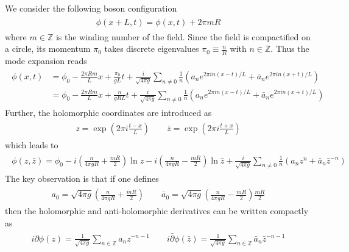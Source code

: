 We consider the following boson configuration
\begin{eqnarray}\begin{aligned}
\phi(x+L,t)=\phi(x,t)+2\pi mR
\end{aligned}\end{eqnarray}
where $m\in\mathbb{Z}$ is the winding number of the field. Since the field is compactified on a circle, its momentum $\pi_0$ takes discrete eigenvalues $\pi_0\equiv\frac{n}{R}$ with $n\in\mathbb{Z}$. Thus the mode expansion reads
\begin{eqnarray}\begin{aligned}
\label{eq:mode_expand_compact}
\phi(x,t)&=\phi_0-\frac{2\pi Rm}{L}x+\frac{\pi_0}{gL}t+\frac{i}{\sqrt{4\pi g}}\sum_{n\neq0}\frac{1}{n}(a_ne^{2\pi i n(x-t)/L}+\bar{a}_{n}e^{2\pi i n(x+t)/L})\\ 
&={\phi}_0-\frac{2\pi Rm}{L}x+\frac{n}{gRL}t+\frac{i}{\sqrt{4\pi g}}\sum_{n\neq0}\frac{1}{n}(a_ne^{2\pi i n(x-t)/L}+\bar{a}_{n}e^{2\pi i n(x+t)/L})
\end{aligned}\end{eqnarray}
Further, the holomorphic coordinates are introduced as
\begin{eqnarray}\begin{aligned}
z=\exp\left(2\pi i\frac{t-x}{L}\right)\qquad\bar{z}=\exp\left(2\pi i\frac{t+x}{L}\right)
\end{aligned}\end{eqnarray}
which leads to 
\begin{eqnarray}\begin{aligned}
\label{eq:phi_in_z}
\phi(z,\bar{z})=\phi_0-i\left(\frac{n}{4\pi gR}+\frac{mR}{2}\right)\ln z-i\left(\frac{n}{4\pi gR}-\frac{mR}{2}\right)\ln \bar{z}+\frac{i}{\sqrt{4\pi g}}\sum_{n\neq0}\frac{1}{n}(a_nz^{n}+\bar{a}_{n}\bar{z}^{-n})
\end{aligned}\end{eqnarray}
The key observation is that if one defines
\begin{eqnarray}\begin{aligned}
a_0=\sqrt{4\pi g}\left(\frac{n}{4\pi gR}+\frac{mR}{2}\right)\qquad\bar{a}_0=\sqrt{4\pi g}\left(\frac{n}{4\pi gR}-\frac{mR}{2}\right)\frac{mR}{2}
\end{aligned}\end{eqnarray}
then the holomorphic and anti-holomorphic derivatives can be written compactly as
\begin{eqnarray}\begin{aligned}
i\partial\phi(z)=\frac{1}{\sqrt{4\pi g}}\sum_{n\in\mathbb{Z}}a_{n}z^{-n-1}\qquad i\bar{\partial}\phi(\bar{z})=\frac{1}{\sqrt{4\pi g}}\sum_{n\in\mathbb{Z}}\bar{a}_{n}\bar{z}^{-n-1}
\end{aligned}\end{eqnarray}
